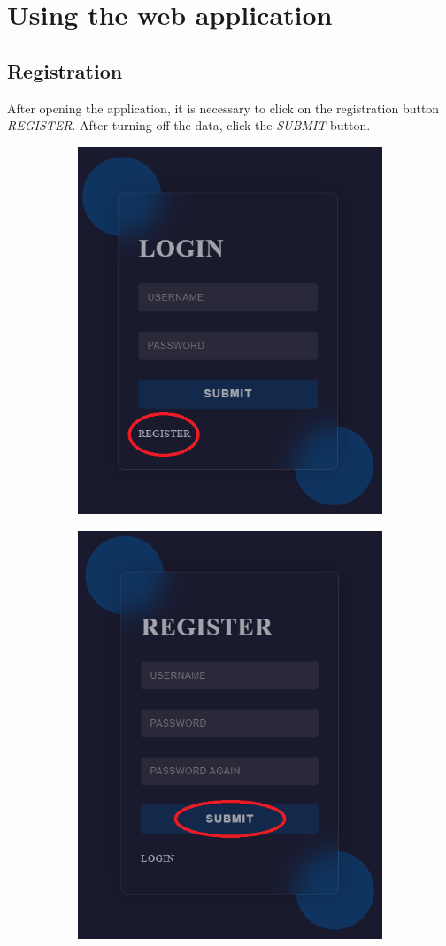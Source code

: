\pagebreak
\section{Using the web application}

\subsection{Registration}
After opening the application, it is necessary to click on the registration button \textit{REGISTER}. After turning off the data, click the \textit{SUBMIT} button.

\begin{figure}[H]
     \centering
     \begin{subfigure}{0.45\textwidth}
         \centering
         \includegraphics[width=.7\textwidth]{guide_includes/img/register_button.png}
     \end{subfigure}
     \begin{subfigure}{0.45\textwidth}
         \centering
         \includegraphics[width=.7\textwidth]{guide_includes/img/register_submit.png}

\end{subfigure}
\end{figure}
